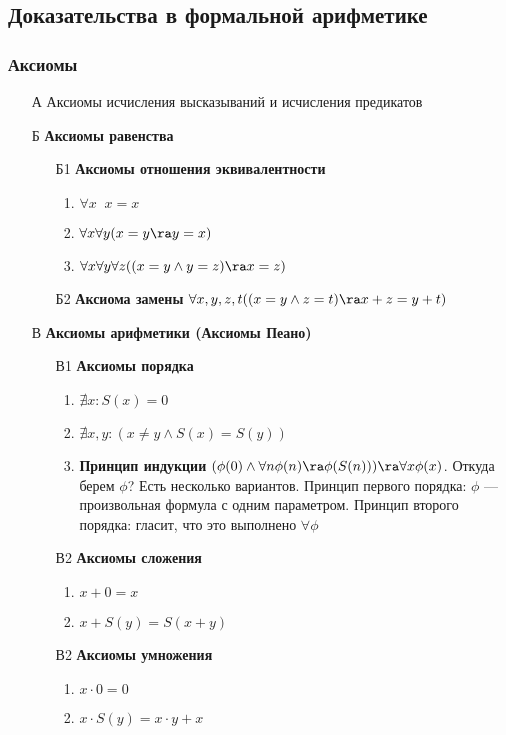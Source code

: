 \subsection{Доказательства в формальной арифметике}
\subsubsection{Аксиомы}
\begin{enumerate}
    \item[А] Аксиомы исчисления высказываний и исчисления предикатов
    \item[Б] \textbf{Аксиомы равенства} 
    \begin{enumerate}
        \item[Б1] \textbf{Аксиомы отношения эквивалентности}
        \begin{enumerate}
            \item \(\forall x\;\;x = x\)
            \item \(\forall x \forall y (x = y \ra y = x)\) 
            \item \(\forall x \forall y \forall z ((x = y \wedge y = z) \ra x = z)\)
        \end{enumerate}
        \item[Б2] \textbf{Аксиома замены} \(\forall x, y, z, t ((x = y \wedge z = t) \ra x + z = y + t)\)
    \end{enumerate}
    \item[В] \textbf{Аксиомы арифметики (Аксиомы Пеано)}
    \begin{enumerate}
        \item[В1] \textbf{Аксиомы порядка}
        \begin{enumerate}
            \item \(\nexists x: S(x) = 0\)
            \item \(\nexists x, y: (x \ne y \wedge S(x) = S(y))\)
            \item \textbf{Принцип индукции} \((\phi(0) \wedge \forall n \phi(n) \ra \phi(S(n))) \ra \forall x \phi(x)\).
            Откуда берем \(\phi\)? Есть несколько вариантов. Принцип первого порядка: \(\phi\) --- произвольная формула с одним параметром. Принцип второго порядка: гласит, что это выполнено \(\forall \phi\)
        \end{enumerate}
        \item[В2] \textbf{Аксиомы сложения}
        \begin{enumerate}
            \item \(x + 0 = x\)
            \item \(x + S(y) = S(x + y)\)
        \end{enumerate}
        \item[В2] \textbf{Аксиомы умножения}
        \begin{enumerate}
            \item \(x \cdot 0 = 0 \)
            \item \(x \cdot S(y) = x\cdot y + x\)
        \end{enumerate}
    \end{enumerate}
\end{enumerate}

